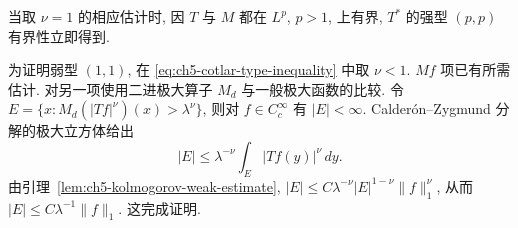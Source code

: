 \hypertarget{chapter-05-page-116}{}
\begin{Proof}
当取 $\nu=1$ 的相应估计时, 因 $T$ 与 $M$ 都在 $L^p$, $p>1$, 上有界, $T^*$ 的强型 $(p,p)$ 有界性立即得到.

为证明弱型 $(1,1)$, 在 \eqref{eq:ch5-cotlar-type-inequality} 中取 $\nu<1$. $Mf$ 项已有所需估计. 对另一项使用二进极大算子 $M_d$ 与一般极大函数的比较. 令 $E=\{x:M_d(|Tf|^\nu)(x)>\lambda^\nu\}$, 则对 $f\in C_c^\infty$ 有 $|E|<\infty$. Calderón--Zygmund 分解的极大立方体给出
\[
 |E|\le\lambda^{-\nu}\int_E|Tf(y)|^\nu\,dy.
\]
由引理~\ref{lem:ch5-kolmogorov-weak-estimate}, $|E|\le C\lambda^{-\nu}|E|^{1-\nu}\|f\|_1^\nu$, 从而 $|E|\le C\lambda^{-1}\|f\|_1$. 这完成证明.
\end{Proof}
